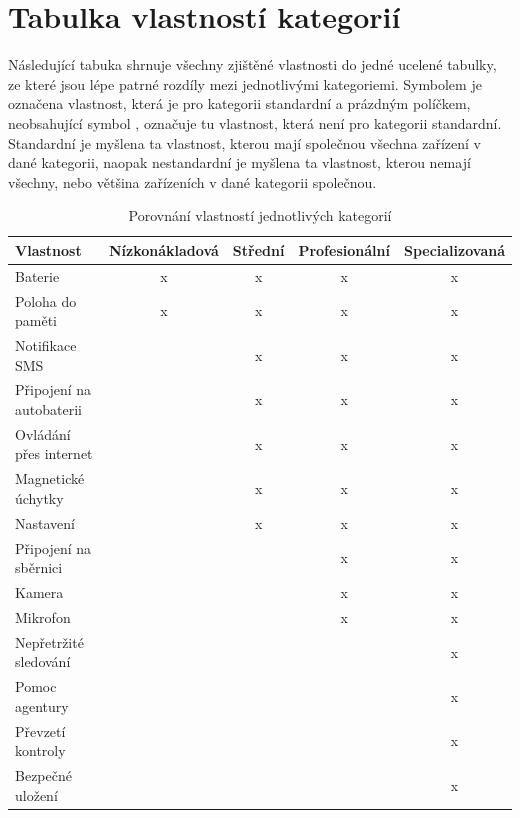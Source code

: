 \documentclass[FM,MP]{tulthesis}  %
\begin{document}

\section{Tabulka vlastností kategorií}
Následující tabuka shrnuje všechny zjištěné vlastnosti do jedné ucelené tabulky, ze které jsou lépe patrné rozdíly mezi jednotlivými kategoriemi. Symbolem  je označena vlastnost, která je pro kategorii standardní a prázdným políčkem, neobsahující symbol , označuje tu vlastnost, která není pro kategorii standardní. Standardní je myšlena ta vlastnost, kterou mají společnou všechna zařízení v dané kategorii, naopak nestandardní je myšlena ta vlastnost, kterou nemají všechny, nebo většina zařízeních v dané kategorii společnou.

\renewcommand{\arraystretch}{1.5}
\begin{table}[H]
\begin{center}
\begin{tabular}{| l | c | c| c | c |}
\hline
Vlastnost & Nízkonákladová & Střední & Profesionální & Specializovaná\\
\hline
\hline
Baterie & x & x & x & x\\
\hline
Poloha do paměti & x & x & x & x\\
\hline
Notifikace SMS & & x & x & x\\
\hline
Připojení na autobaterii & & x & x & x\\
\hline
Ovládání přes internet & & x & x & x\\
\hline
Magnetické úchytky & & x & x & x\\
\hline
Nastavení & & x & x & x\\
\hline
Připojení na sběrnici & & & x & x\\
\hline
Kamera & & & x & x\\
\hline
Mikrofon & & & x & x\\
\hline
Nepřetržité sledování & & & & x\\
\hline
Pomoc agentury & & & & x\\
\hline
Převzetí kontroly & & & & x\\
\hline
Bezpečné uložení & & & & x\\
\hline
\end{tabular}
\end{center}
\caption{Porovnání vlastností jednotlivých kategorií}
\end{table}

\end{document}

